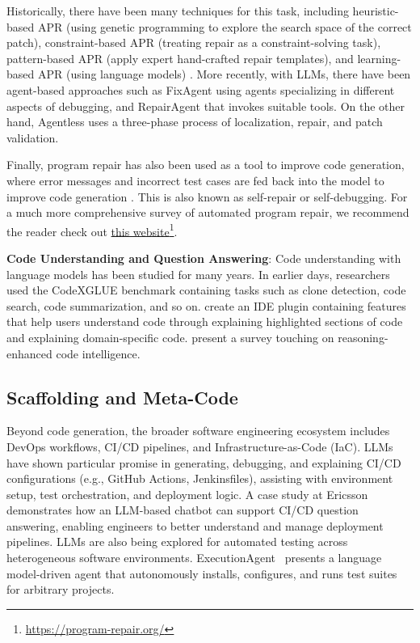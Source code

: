 Historically, there have been many techniques for this task, including heuristic-based APR (using genetic programming to explore the search space of the correct patch), constraint-based APR (treating repair as a constraint-solving task), pattern-based APR (apply expert hand-crafted repair templates), and learning-based APR (using language models) \citep{zhang2024systematic}.
More recently, with LLMs, there have been agent-based approaches such as FixAgent \citep{lee2024unified} using agents specializing in different aspects of debugging, and RepairAgent \citep{bouzenia2024repairagent} that invokes suitable tools. On the other hand, Agentless \citep{xia2024agentless} uses a three-phase process of localization, repair, and patch validation. 

Finally, program repair has also been used as a tool to improve code generation, where error messages and incorrect test cases are fed back into the model to improve code generation \citep{madaan2023self, chen2024teaching, zhang2023self, olausson2024repair, zhong2024debug, tang2025code}. This is also known as self-repair or self-debugging. 
For a much more comprehensive survey of automated program repair, we recommend the reader check out \href{https://program-repair.org/}{this website}\footnote{\url{https://program-repair.org/}}.


\textbf{Code Understanding and Question Answering}: Code understanding with language models has been studied for many years. In earlier days, researchers used the CodeXGLUE \citep{lu2021codexglue} benchmark containing tasks such as clone detection, code search, code summarization, and so on. \citet{nam2024using} create an IDE plugin containing features that help users understand code through explaining highlighted sections of code and explaining domain-specific code. \citet{yang2025code} present a survey touching on reasoning-enhanced code intelligence.


\subsection{Scaffolding and Meta-Code}
Beyond code generation, the broader software engineering ecosystem includes DevOps workflows, CI/CD pipelines, and Infrastructure-as-Code (IaC). 
LLMs have shown particular promise in generating, debugging, and explaining CI/CD configurations (e.g., GitHub Actions, Jenkinsfiles), assisting with environment setup, test orchestration, and deployment logic. 
A case study at Ericsson~\citep{chaudhary2024developing} demonstrates how an LLM-based chatbot can support CI/CD question answering, enabling engineers to better understand and manage deployment pipelines.
LLMs are also being explored for automated testing across heterogeneous software environments. 
ExecutionAgent~\citep{bouzenia2024itirunit} presents a language model-driven agent that autonomously installs, configures, and runs test suites for arbitrary projects.

